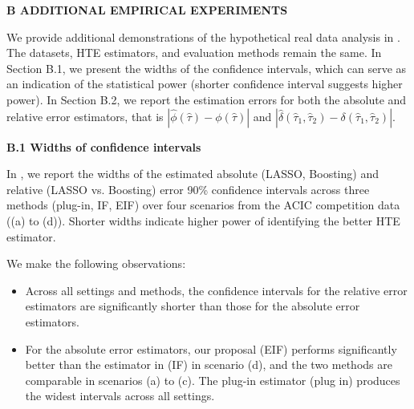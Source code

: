 



\textbf{B ADDITIONAL EMPIRICAL EXPERIMENTS} 

We provide additional demonstrations of the hypothetical real data analysis in . The datasets, HTE estimators, and evaluation methods remain the same. 
In Section B.1, we present the widths of the confidence intervals, which can serve as an indication of the statistical power (shorter confidence interval suggests higher power). 
In Section B.2, we report the estimation errors for both the absolute and relative error estimators, that is $|\hat{\phi}(\hat{\tau}) - \phi(\hat{\tau})|$ and $|\hat{\delta}(\hat{\tau}_1, \hat{\tau}_2) - \delta(\hat{\tau}_1, \hat{\tau}_2)|$.


\textbf{B.1 Widths of confidence intervals}

In , we report the widths of the estimated absolute (LASSO, Boosting) and relative (LASSO vs. Boosting) error 90\% confidence intervals across three methods (plug-in, IF, EIF) over four scenarios from the ACIC competition data ((a) to (d)).
Shorter widths indicate higher power of identifying the better HTE estimator.


We make the following observations:
\begin{itemize}
    \item Across all settings and methods, the confidence intervals for the relative error estimators are significantly shorter than those for the absolute error estimators.
    \item For the absolute error estimators, our proposal (EIF) performs significantly better than the estimator in \cite{alaa2019validating} (IF) in scenario (d), and the two methods are comparable in scenarios (a) to (c). The plug-in estimator (plug in) produces the widest intervals across all settings.
\end{itemize}


